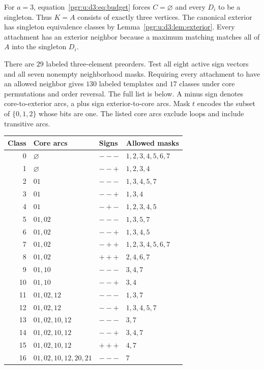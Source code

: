 \documentclass[11pt]{article}
\numberwithin{equation}{section}
\theoremstyle{definition}\newtheorem{definition}[theorem]{Definition}\newtheorem{remark}[theorem]{Remark}
\begin{document}
For $a=3$, equation~\eqref{pgr:u:d3:eq:budget} forces $C=\varnothing$ and every $D_i$ to be a singleton. Thus $K=A$ consists of exactly three vertices. The canonical exterior has singleton equivalence classes by Lemma~\ref{pgr:u:d3:lem:exterior}. Every attachment has an exterior neighbor because a maximum matching matches all of $A$ into the singleton $D_i$.

There are $29$ labeled three-element preorders. Test all eight active sign vectors and all seven nonempty neighborhood masks. Requiring every attachment to have an allowed neighbor gives $130$ labeled templates and $17$ classes under core permutations and order reversal. The full list is below. A minus sign denotes core-to-exterior arcs, a plus sign exterior-to-core arcs. Mask $t$ encodes the subset of $\{0,1,2\}$ whose bits are one. The listed core arcs exclude loops and include transitive arcs.

\begin{center}\small
\begin{tabular}{rlll}
\toprule
Class & Core arcs & Signs & Allowed masks\\\midrule
0 & $\varnothing$ & $---$ & $1,2,3,4,5,6,7$\\
1 & $\varnothing$ & $--+$ & $1,2,3,4$\\
2 & $01$ & $---$ & $1,3,4,5,7$\\
3 & $01$ & $--+$ & $1,3,4$\\
4 & $01$ & $-+-$ & $1,2,3,4,5$\\
5 & $01,02$ & $---$ & $1,3,5,7$\\
6 & $01,02$ & $--+$ & $1,3,4,5$\\
7 & $01,02$ & $-++$ & $1,2,3,4,5,6,7$\\
8 & $01,02$ & $+++$ & $2,4,6,7$\\
9 & $01,10$ & $---$ & $3,4,7$\\
10 & $01,10$ & $--+$ & $3,4$\\
11 & $01,02,12$ & $---$ & $1,3,7$\\
12 & $01,02,12$ & $--+$ & $1,3,4,5,7$\\
13 & $01,02,10,12$ & $---$ & $3,7$\\
14 & $01,02,10,12$ & $--+$ & $3,4,7$\\
15 & $01,02,10,12$ & $+++$ & $4,7$\\
16 & $01,02,10,12,20,21$ & $---$ & $7$\\\bottomrule
\end{tabular}
\end{center}
\end{document}

